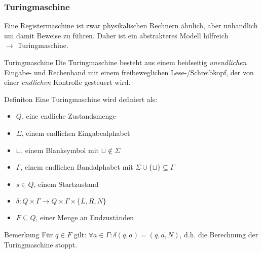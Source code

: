\documentclass{beamer}
\begin{document}
\begin{frame}
\frametitle{Turingmaschine}
Eine Registermaschine ist zwar physikalischen Rechnern ähnlich, aber unhandlich um damit Beweise zu führen.
Daher ist ein abstrakteres Modell hilfreich \\
$\rightarrow$ Turingmaschine.
\pause
\begin{block}{Turingmaschine}
Die Turingmaschine besteht aus einem beidseitig \emph{unendlichen} Eingabe- und Rechenband
mit einem freibeweglichen Lese-/Schreibkopf, der von einer \emph{endlichen} Kontrolle gesteuert wird. 
\end{block}
\end{frame}
\begin{frame}
\vspace{-1cm}
\begin{block}{Definiton}
Eine Turingmaschine wird definiert als:
 \begin{itemize}
 \item $Q$, eine endliche Zustandsmenge
 \item $\Sigma$, einem endlichen Eingabealphabet
 \item $\sqcup$, einem Blanksymbol mit $\sqcup \notin \Sigma$
 \item $\Gamma$, einem endlichen Bandalphabet mit $\Sigma \cup\{\sqcup\} \subseteq \Gamma$
 \item $s \in Q$, einem Startzustand
 \item $\delta: Q\times\Gamma \rightarrow Q\times\Gamma\times\{L, R, N\}$
 \item $F \subseteq Q$, einer Menge an Endzuständen
 \end{itemize}
\end{block}
\begin{block}{Bemerkung}
 Für $q\in F$ gilt: $\forall a \in \Gamma: \delta(q, a) = (q, a, N)$, d.h. die Berechnung der Turingmaschine stoppt.
\end{block}
\end{frame}

\end{document}
